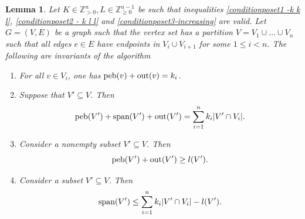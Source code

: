 \documentclass[10pt,a4paper]{article}
\newtheorem{lemma}[theorem]{Lemma}
\newcommand{\out}{\textup{out}}
\newcommand{\spa}{\textup{span}}
\newcommand{\peb}{\textup{peb}}
\begin{document}
\begin{lemma}\label{invariants - posets}
 Let $K\in \mathbb{Z}_{>0}^{n}, L\in \mathbb{Z}_{\geq 0}^{n-1}$ be such that inequalities \eqref{conditionposet1 -k k l}, \eqref{conditionposet2 - k l l} and \eqref{conditionposet3-increasing} are valid. Let $G=(V,E)$ be a graph such that the vertex set has a partition $V=V_1\cup \dots \cup V_n$ such that all edges $e\in E$ have endpoints in $V_{i} \cup V_{i+1}$ for some $1 \leq i < n$. The following are invariants of the algorithm
    \begin{enumerate}
        \item For all $v\in V_i$, one has $\peb(v)+ \out(v) = k_{i}$.
        \item Suppose that $V'\subseteq V$. Then $$\peb(V')+ \spa(V')+ \out(V') = \sum_{i=1}^{n} k_i \vert  V' \cap V_i  \vert.$$
        \item Consider a nonempty subset $V' \subseteq V$. Then $$\peb(V') + \out(V') \geq l(V').$$ 
    \item Consider a subset $V' \subseteq V$. Then $$\spa(V') \leq \sum_{i=1}^{n} k_i \vert  V' \cap V_i \vert - l(V').$$
    \end{enumerate}
\end{lemma}
\end{document}
